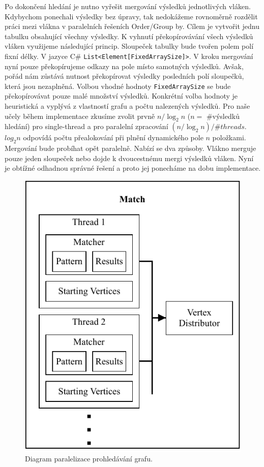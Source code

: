 Po dokončení hledání je nutno vyřešit mergování výsledků jednotlivých vláken.
Kdybychom ponechali výsledky bez úpravy, tak nedokážeme rovnoměrně rozdělit práci mezi vlákna v paralelních řešeních Order/Group by.
Cílem je vytvořit jednu tabulku obsahující všechny výsledky.
K vyhnutí překopírovávání všech výsledků vláken využijeme následující princip.
Sloupeček tabulky bude tvořen polem polí fixní délky.
V jazyce C\# \texttt{List<Element[FixedArraySize]>}.
V kroku mergování nyní pouze překopírujeme odkazy na pole místo samotných výsledků.
Avšak, pořád nám zůstává nutnost překopírovat výsledky posledních polí sloupečků, která jsou nezaplněná.
Volbou vhodné hodnoty \texttt{FixedArraySize} se bude překopírovávat pouze malé množství výsledků.
Konkrétní volba hodnoty je heuristická a vyplývá z vlastností grafu a počtu nalezených výsledků.
Pro naše učely během implementace zkusíme zvolit prvně $n/\log_2 n$ ($n = $ \#výsledků hledání) pro single-thread a pro paralelní zpracování $(n/\log_2 n)/\#threads$.
$log_2 n$ odpovídá počtu přealokování při plnění dynamického pole $n$ položkami.
Mergování bude probíhat opět paralelně.
Nabízí se dva způsoby.
Vlákno merguje pouze jeden sloupeček nebo dojde k dvoucestnému mergi výsledků vláken.
Nyní je obtížné odhadnou správné řešení a proto jej ponecháme na dobu implementace.    

\begin{figure}[!htp]
\includegraphics{../img/diaQueryObjectsMatchPar.pdf}\centering
\caption{Diagram paralelizace prohledávání grafu.}
\label{figure.diaQueryObjectsMatchPar}
\end{figure}

